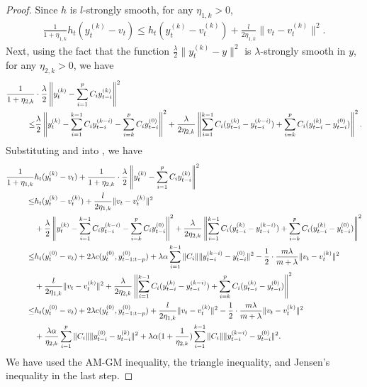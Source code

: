 \begin{proof}
Since $h$ is $l$-strongly smooth, for any $\eta_{1,k}>0$,
\begin{align}\label{appendix.a.2}
    \frac{1}{1+\eta_{1,k}}h_t(y_t^{(k)}-v_t)\le h_t(y_t^{(k)}-v_t^{(k)})+\frac{l}{2\eta_{1,k}}\|v_t-v_t^{(k)}\|^2.
\end{align}
Next, using the fact that the function $\frac{\lambda}{2}\|y_t^{(k)}-y\|^2$ is $\lambda$-strongly smooth in $y$, for any $\eta_{2,k}>0$, we have
\begin{align}\label{appendix.a.3}
    \frac{1}{1+\eta_{2,k}}&\cdot\frac{\lambda}{2}\left\|y_t^{(k)}-\sum_{i=1}^pC_iy_{t-i}^{(k)}\right\|^2\notag\\
    \le&\frac{\lambda}{2}\left\|y_t^{(k)}-\sum_{i=1}^{k-1}C_iy_{t-i}^{(k-i)}-\sum_{i=k}^pC_iy_{t-i}^{(0)}\right\|^2+\frac{\lambda}{2\eta_{2,k}}\left\|\sum_{i=1}^{k-1}C_i(y_{t-i}^{(k)}-y_{t-i}^{(k-i)})+\sum_{i=k}^pC_i(y_{t-i}^{(k)}-y_{t-i}^{(0)})\right\|^2.
\end{align}
Substituting  and  into , we have 
\begin{align}\label{appendix.a.4}
    \frac{1}{1+\eta_{1,k}}&h_t(y_t^{(k)}-v_t)+\frac{1}{1+\eta_{2,k}}\cdot\frac{\lambda}{2}\left\|y_t^{(k)}-\sum_{i=1}^pC_iy_{t-i}^{(k)}\right\|^2\notag\\
\le&h_t(y_t^{(k)}-v_t^{(k)})+\frac{l}{2\eta_{1,k}}\|v_t-v_t^{(k)}\|^2\notag\\
&+\frac{\lambda}{2}\left\|y_t^{(k)}-\sum_{i=1}^{k-1}C_iy_{t-i}^{(k-i)}-\sum_{i=k}^pC_iy_{t-i}^{(0)}\right\|^2+\frac{\lambda}{2\eta_{2,k}}\left\|\sum_{i=1}^{k-1}C_i(y_{t-i}^{(k)}-y_{t-i}^{(k-i)})+\sum_{i=k}^pC_i(y_{t-i}^{(k)}-y_{t-i}^{(0)})\right\|^2\notag\\
\le&h_t(y_t^{(0)}-v_t)+2\lambda c(y_t^{(0)},y_{t-1:t-p}^{(0)})+\lambda\alpha\sum_{i=1}^{k-1}\|C_i\|\|y_{t-i}^{(k-i)}-y_{t-i}^{(0)}\|^2-\frac{1}{2}\cdot\frac{m\lambda}{m+\lambda}\|v_t-v_t^{(k)}\|^2\notag\\
&+\frac{l}{2\eta_{1,k}}\|v_t-v_t^{(k)}\|^2+\frac{\lambda}{2\eta_{2,k}}\left\|\sum_{i=1}^{k-1}C_i(y_{t-i}^{(k)}-y_{t-i}^{(k-i)})+\sum_{i=k}^pC_i(y_{t-i}^{(k)}-y_{t-i}^{(0)})\right\|^2\notag\\
\le&h_t(y_t^{(0)}-v_t)+2\lambda c(y_t^{(0)},y_{t-1:t-p}^{(0)})+\frac{l}{2\eta_{1,k}}\|v_t-v_t^{(k)}\|^2-\frac{1}{2}\cdot\frac{m\lambda}{m+\lambda}\|v_t-v_t^{(k)}\|^2\notag\\
&+\frac{\lambda\alpha}{\eta_{2,k}}\sum_{i=1}^p\|C_i\|\|y_{t-i}^{(0)}-y_{t-i}^{(k)}\|^2+\lambda\alpha(1+\frac{1}{\eta_{2,k}})\sum_{i=1}^{k-1}\|C_i\|\|y_{t-i}^{(k-i)}-y_{t-i}^{(0)}\|^2.
\end{align}
We have used the AM-GM inequality, the triangle inequality, and Jensen's inequality in the last step.


\end{proof}
